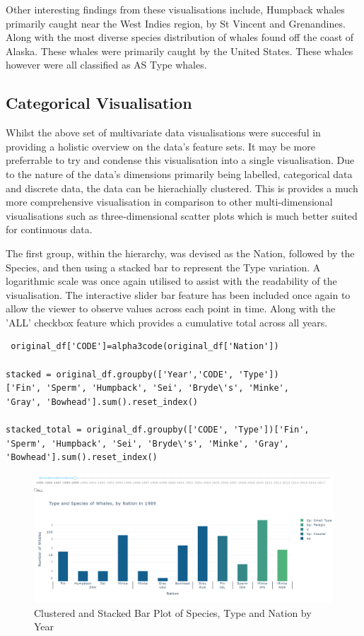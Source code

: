 \documentclass[12pt,a4paper]{article}
\begin{document}
Other interesting findings from these visualisations include, Humpback whales primarily caught near the West Indies region, by St Vincent and Grenandines. Along with the most diverse species distribution of whales found off the coast of Alaska. These whales were primarily caught by the United States. These whales however were all classified as AS Type whales. 



\subsection{Categorical Visualisation}
Whilst the above set of multivariate data visualisations were succesful in providing a holistic overview on the data's feature sets.
It may be more preferrable to try and condense this visualisation into a single visualisation. Due to the nature of the data's dimensions primarily being labelled, categorical data and discrete data, the data can be hierachially clustered. This is provides a much more comprehensive visualisation in comparison to other multi-dimensional visualisations such as three-dimensional scatter plots which is much better suited for continuous data. 

 The first group, within the hierarchy, was devised as the Nation, followed by the Species, and then using a stacked bar to represent the Type variation. A logarithmic scale was once again utilised to assist with the readability of the visualisation. The interactive slider bar feature has been included once again to allow the viewer to observe values across each point in time. Along with the 'ALL' checkbox feature which provides a cumulative total across all years. 
\begin{verbatim}
 original_df['CODE']=alpha3code(original_df['Nation'])

stacked = original_df.groupby(['Year','CODE', 'Type'])
['Fin', 'Sperm', 'Humpback', 'Sei', 'Bryde\'s', 'Minke',
'Gray', 'Bowhead'].sum().reset_index()

stacked_total = original_df.groupby(['CODE', 'Type'])['Fin',
'Sperm', 'Humpback', 'Sei', 'Bryde\'s', 'Minke', 'Gray', 
'Bowhead'].sum().reset_index()
\end{verbatim}
\begin{figure}[H]
    \centering
    \includegraphics[width = 15cm]{Categorical.png}
    \caption{Clustered and Stacked Bar Plot of Species, Type and Nation by Year}
    \label{fig:my_label}
\end{figure}
\end{document}

